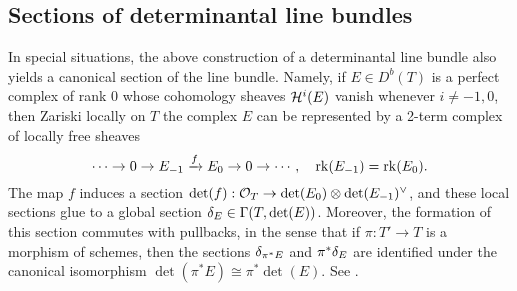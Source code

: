 \documentclass[letterpaper,11pt]{amsart}%
\theoremstyle{remark}
\begin{document}
\subsection{Sections of determinantal line bundles}
In special situations, the above construction of a determinantal line bundle also yields a canonical section of the line bundle. Namely, if $E \in D^b(T)$ is a perfect complex of rank 0 whose cohomology sheaves $\mathcal{H}^i(E)$ vanish whenever $i \neq -1,0$, then Zariski locally on $T$ the complex $E$ can be represented by a 2-term complex of locally free sheaves
\[ \cdots \to 0 \to E_{-1} \xrightarrow{f} E_0 \to 0 \to \cdots, \quad \operatorname{\mathrm{rk}}(E_{-1}) = \operatorname{\mathrm{rk}}(E_0). \]
The map $f$ induces a section $\det(f): \mathcal{O}_T \to \det(E_0) \otimes \det(E_{-1})^\vee$, and these local sections glue to a global section $\delta_E \in \Gamma(T, \det(E))$. Moreover, the formation of this section commutes with pullbacks, in the sense that if $\pi: T' \to T$ is a morphism of schemes, then the sections $\delta_{\pi^*E}$ and $\pi^*\delta_E$ are identified under the canonical isomorphism $\det(\pi^* E) \cong \pi^*\det(E)$. See \cite[\href{https://stacks.math.columbia.edu/tag/0FJX}{Tag 0FJX}]{stacks-project}.
\end{document}
